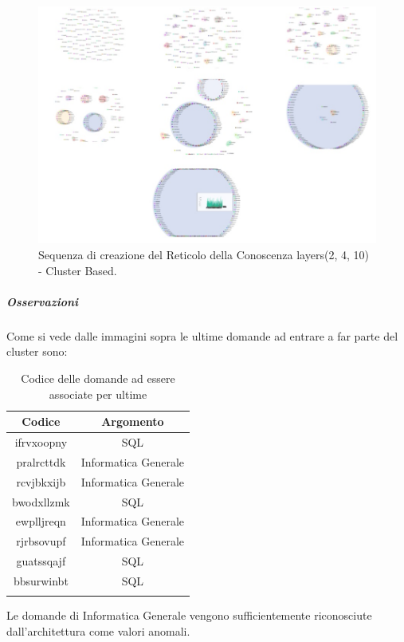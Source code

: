\begin{figure}[H]
\centering
	\includegraphics[width=0.70\linewidth]{./image/collage_reticolo-sql(2,4,10).png}
	\caption{Sequenza di creazione del Reticolo della Conoscenza layers(2, 4, 10) - Cluster Based.}
	\label{Sequenza di creazione del Reticolo della Conoscenza layers(2, 4, 10) - Cluster Based.}
\end{figure}
\noindent
\subparagraph{Osservazioni}\mbox{}
\noindent
Come si vede dalle immagini sopra le ultime domande ad entrare a far parte del cluster sono:

\begin{longtable}{|c|c|}
	\hline
	\textbf{Codice} & \textbf{Argomento} \\\hline\hline
	ifrvxoopny & SQL \\
	pralrcttdk & Informatica Generale \\
	rcvjbkxijb & Informatica Generale \\
	bwodxllzmk & SQL \\
	ewplljreqn & Informatica Generale \\
	rjrbsovupf & Informatica Generale \\
	guatssqajf & SQL \\
	bbsurwinbt & SQL \\
\hline
	
\caption{Codice delle domande ad essere associate per ultime}\label{tab:codice delle domande ad essere associate per ultime}
\end{longtable}
\noindent
Le domande di Informatica Generale vengono sufficientemente riconosciute dall'architettura come valori anomali.

